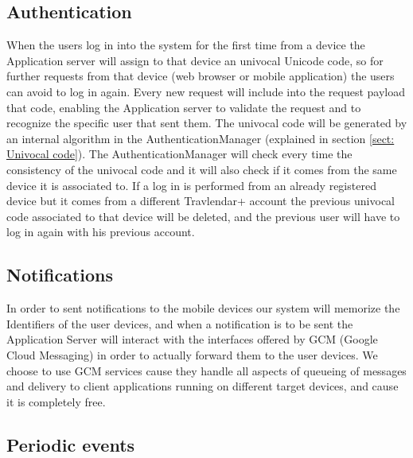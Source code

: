 \subsection{Authentication}
When the users log in into the system for the first time from a device the Application server will assign to that device an univocal Unicode code, so for further requests from that device (web browser or mobile application) the users can avoid to log in again. Every new request will include into the request payload that code, enabling the Application server to validate the request and to recognize the specific user that sent them. The univocal code will be generated by an internal algorithm in the AuthenticationManager (explained in section \ref{sect: Univocal code}). The AuthenticationManager will check every time the consistency of the univocal code and it will also check if it comes from the same device it is associated to.
If a log in is performed from an already registered device but it comes from a different Travlendar+ account the previous univocal code associated to that device will be deleted, and the previous user will have to log in again with his previous account.

\subsection{Notifications}
In order to sent notifications to the mobile devices our system will memorize the Identifiers of the user devices, and when a notification is to be sent the Application Server will interact with the interfaces offered by GCM (Google Cloud Messaging) in order to actually forward them to the user devices. We choose to use GCM services cause they handle all aspects of queueing of messages and delivery to client applications running on different target devices, and cause it is completely free.

\subsection{Periodic events}
